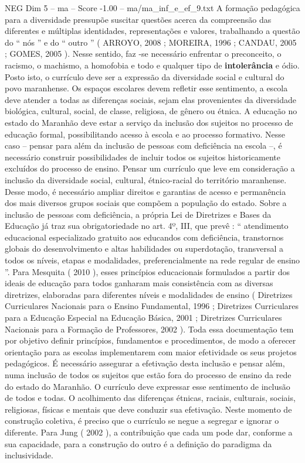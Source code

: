 \begin{textsample}{NEG Dim 5 – ma – Score -1.00 – ma/ma\_inf\_e\_ef\_9.txt}
A formação pedagógica para a diversidade pressupõe suscitar questões acerca da compreensão das diferentes e múltiplas identidades, representações e valores, trabalhando a questão do “ nós ” e do “ outro ” ( ARROYO, 2008 ; MOREIRA, 1996 ; CANDAU, 2005 ; GOMES, 2005 ).
Nesse sentido, faz -se necessário enfrentar o preconceito, o racismo, o machismo, a homofobia e todo e qualquer tipo de \textbf{intolerância} e ódio.
Posto isto, o currículo deve ser a expressão da diversidade social e cultural do povo maranhense.
Os espaços escolares devem refletir esse sentimento, a escola deve atender a todas as diferenças sociais, sejam elas provenientes da diversidade biológica, cultural, social, de classe, religiosa, de gênero ou étnica.
A educação no estado do Maranhão deve estar a serviço da inclusão dos sujeitos no processo de educação formal, possibilitando acesso à escola e ao processo formativo.
Nesse caso – pensar para além da inclusão de pessoas com deficiência na escola –, é necessário construir possibilidades de incluir todos os sujeitos historicamente excluídos do processo de ensino.
Pensar um currículo que leve em consideração a inclusão da diversidade social, cultural, étnico-racial do território maranhense.
Desse modo, é necessário ampliar direitos e garantias de acesso e permanência dos mais diversos grupos sociais que compõem a população do estado.
Sobre a inclusão de pessoas com deficiência, a própria Lei de Diretrizes e Bases da Educação já traz sua obrigatoriedade no art. 4º, III, que prevê : “ atendimento educacional especializado gratuito aos educandos com deficiência, transtornos globais do desenvolvimento e altas habilidades ou superdotação, transversal a todos os níveis, etapas e modalidades, preferencialmente na rede regular de ensino ”.
Para Mesquita ( 2010 ), esses princípios educacionais formulados a partir dos ideais de educação para todos ganharam mais consistência com as diversas diretrizes, elaboradas para diferentes níveis e modalidades de ensino ( Diretrizes Curriculares Nacionais para o Ensino Fundamental, 1996 ; Diretrizes Curriculares para a Educação Especial na Educação Básica, 2001 ; Diretrizes Curriculares Nacionais para a Formação de Professores, 2002 ).
Toda essa documentação tem por objetivo definir princípios, fundamentos e procedimentos, de modo a oferecer orientação para as escolas implementarem com maior efetividade os seus projetos pedagógicos.
É necessário assegurar a efetivação desta inclusão e pensar além, numa inclusão de todos os sujeitos que estão fora do processo de ensino da rede do estado do Maranhão.
O currículo deve expressar esse sentimento de inclusão de todos e todas.
O acolhimento das diferenças étnicas, raciais, culturais, sociais, religiosas, físicas e mentais que deve conduzir sua efetivação.
Neste momento de construção coletiva, é preciso que o currículo se negue a segregar e ignorar o diferente.
Para Jung ( 2002 ), a contribuição que cada um pode dar, conforme a sua capacidade, para a construção do outro é a definição do paradigma da inclusividade.

\end{textsample}
